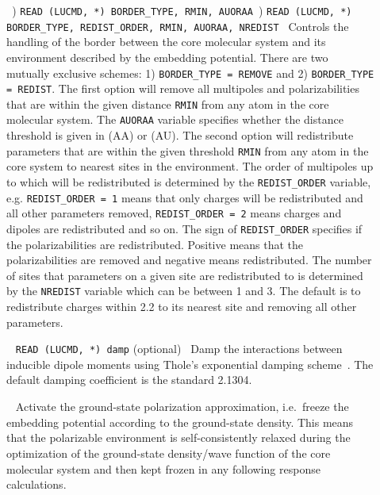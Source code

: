 \begin{description}
\item[]\verb| |) \verb|READ (LUCMD, *) BORDER_TYPE, RMIN, AUORAA|\verb| |) \verb|READ (LUCMD, *) BORDER_TYPE, REDIST_ORDER, RMIN, AUORAA, NREDIST|\verb| |\newline
Controls the handling of the border between the core molecular system
and its environment described by the embedding potential. There are
two mutually exclusive schemes: 1) \verb|BORDER_TYPE = REMOVE| and 2)
\verb|BORDER_TYPE = REDIST|. The first option will remove all
multipoles and polarizabilities that are within the given distance
\verb|RMIN| from any atom in the core molecular system. The
\verb|AUORAA| variable specifies whether the distance threshold is
given in \angstrom{} (AA) or \bohr{} (AU). The second option will
redistribute parameters that are within the given threshold
\verb|RMIN| from any atom in the core system to nearest sites in the
environment. The order of multipoles up to which will be redistributed
is determined by the \verb|REDIST_ORDER| variable,
e.g. \verb|REDIST_ORDER = 1| means that only charges will be
redistributed and all other parameters removed,
\verb|REDIST_ORDER = 2| means charges and dipoles are redistributed
and so on. The sign of \verb|REDIST_ORDER| specifies if the
polarizabilities are redistributed. Positive means that the
polarizabilities are removed and negative means redistributed. The
number of sites that parameters on a given site are redistributed to
is determined by the \verb|NREDIST| variable which can be between 1
and 3. The default is to redistribute charges within 2.2 \bohr{} to its
nearest site and removing all other parameters.

\item[]\verb| |\newline
\verb|READ (LUCMD, *) damp| (optional)\verb| |\newline
Damp the interactions between inducible dipole moments using Thole's exponential damping scheme~\cite{thole_damp_1,thole_damp_2}. The default damping coefficient is the standard 2.1304.

\item[]\verb| |\newline
Activate the ground-state polarization approximation, i.e.\ freeze the embedding potential according to the ground-state density. This means that the polarizable environment is self-consistently relaxed during the optimization of the ground-state density/wave function of the core molecular system and then kept frozen in any following response calculations.


\end{description}
